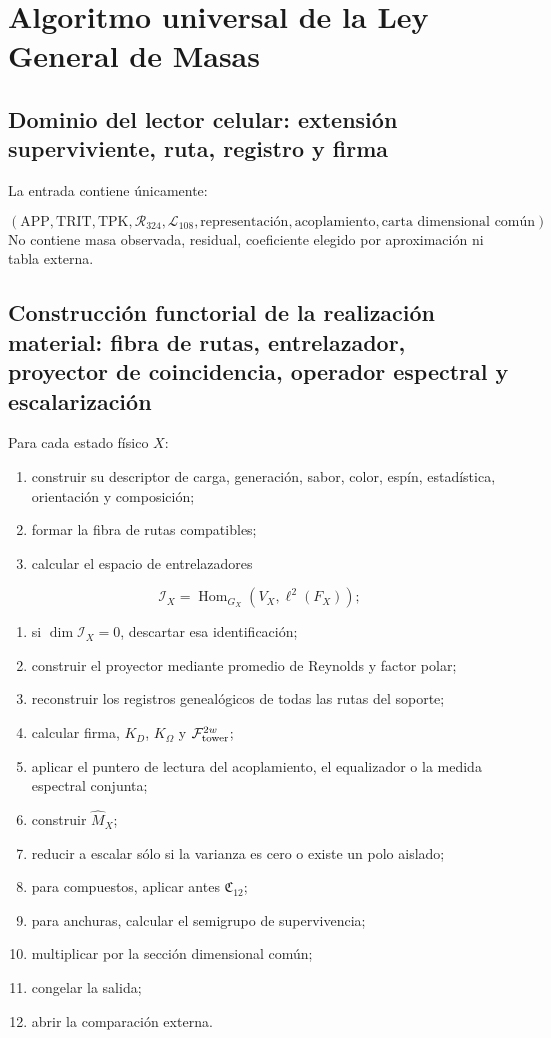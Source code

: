 \section{Algoritmo universal de la Ley General de Masas}
\subsection{Dominio del lector celular: extensión superviviente, ruta, registro y firma}
La entrada contiene únicamente:

\[
 (\mathrm{APP},\mathrm{TRIT},\mathrm{TPK},
 \mathcal R_{324},\mathcal L_{108},
 \text{representación},\text{acoplamiento},
 \text{carta dimensional común}).
\]
No contiene masa observada, residual, coeficiente elegido por aproximación ni tabla externa.

\subsection{Construcción functorial de la realización material: fibra de rutas, entrelazador, proyector de coincidencia, operador espectral y escalarización}
Para cada estado físico \(X\):

\begin{enumerate}
\item construir su descriptor de carga, generación, sabor, color, espín, estadística,
orientación y composición;

\item formar la fibra de rutas compatibles;
\item calcular el espacio de entrelazadores
\end{enumerate}
   \[
   \mathscr I_X=
   \operatorname{Hom}_{G_X}(V_X,\ell^2(F_X));
   \]
\begin{enumerate}
\item si \(\dim\mathscr I_X=0\), descartar esa identificación;
\item construir el proyector mediante promedio de Reynolds y factor polar;
\item reconstruir los registros genealógicos de todas las rutas del soporte;
\item calcular firma, \(K_D\), \(K_\Omega\) y
\(\mathcal F_{\rm tower}^{2w}\);

\item aplicar el puntero de lectura del acoplamiento, el equalizador o la medida
espectral conjunta;

\item construir \(\widehat M_X\);
\item reducir a escalar sólo si la varianza es cero o existe un polo aislado;
\item para compuestos, aplicar antes \(\mathfrak C_{12}\);
\item para anchuras, calcular el semigrupo de supervivencia;
\item multiplicar por la sección dimensional común;
\item congelar la salida;
\item abrir la comparación externa.
\end{enumerate}

